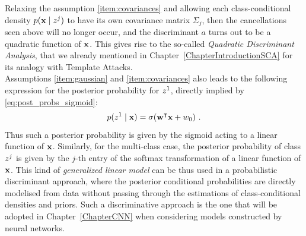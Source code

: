 Relaxing the assumption \ref{item:covariances} and allowing each class-conditional density $p(\textbf{x}\mid z^j)$ to have its own covariance matrix $\Sigma_j$, then the cancellations seen above will no longer occur, and the discriminant $a$ turns out to be a quadratic function of $\textbf{x}$. This gives rise to the so-called \emph{Quadratic Discriminant Analysis}, that we already mentioned in Chapter~\ref{ChapterIntroductionSCA} for its analogy with Template Attacks.\\

Assumptions \ref{item:gaussian} and \ref{item:covariances} also leads to the following expression for the posterior probability for $z^1$, directly implied by \eqref{eq:post_probs_sigmoid}: 
\begin{equation}
p(z^1\mid \textbf{x}) = \sigma(\textbf{w}^\intercal \textbf{x} + w_0)\mbox{ .}
\end{equation}
Thus such a posterior probability is given by the sigmoid acting to a linear function of $\textbf{x}$. Similarly, for the multi-class case, the posterior probability of class $z^j$ is given by the $j$-th entry of the softmax transformation of a linear function of $\textbf{x}$. This kind of \emph{generalized linear model} can be thus used in a probabilistic discriminant approach, where the posterior conditional probabilities are directly modelised from data without passing through the estimations of class-conditional densities and priors. Such a discriminative approach is the one that will be adopted in Chapter~\ref{ChapterCNN} when considering models constructed by neural networks.






